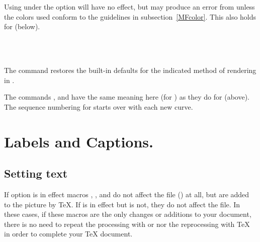 \documentclass[letterpaper]{article}
\begin{document}
Using  under the  option
will have no effect, but may produce an error from \MF{} unless the
colors used conform to the guidelines in subsection~\ref{MFcolor}.
This also holds for  (below).

\begin{cd}
\\
\\
\end{cd}

The command  restores the built-in defaults for the
indicated method of rendering in .

The commands ,  and  have the
same meaning here (for ) as they do for 
(above). The sequence numbering for  starts over with each
new curve.

\section{Labels and Captions.}\label{labels}

\subsection{Setting text}\label{text}

If option  is in effect macros , ,
 and  do not affect the \MF{} file
() at all, but are added to the picture by \TeX{}. If
 is in effect but  is not, they do not
affect the \MP{} file. In these cases, if these macros are the only
changes or additions to your document, there is no need to repeat the
processing with \MF{} or \MP{} nor the reprocessing with \TeX{} in order
to complete your \TeX{} document.

\begin{cd}
\\
\\
%
%
\end{cd}
\end{document}
